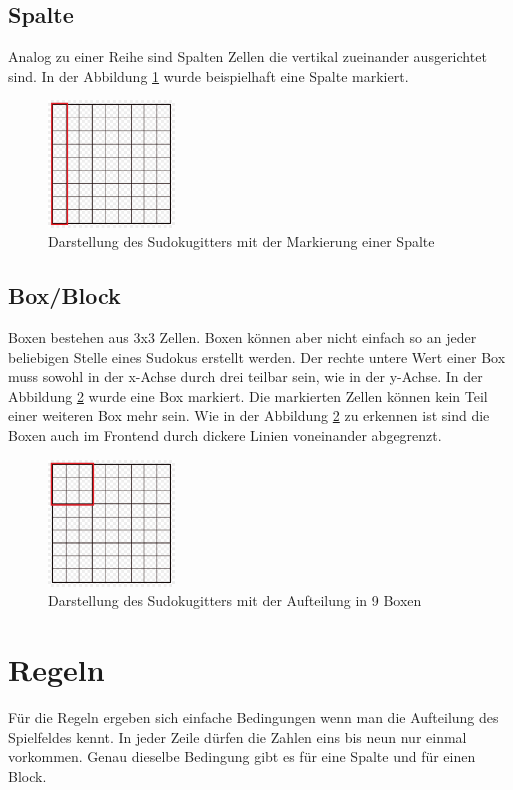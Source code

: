 \subsection{Spalte}
Analog zu einer Reihe sind Spalten Zellen die vertikal zueinander ausgerichtet sind. In der Abbildung \ref{fig:SudokugitterSpalte} wurde beispielhaft eine Spalte markiert.
\begin{figure}[htbp]
	\centering
	\includegraphics[width=0.3\textwidth]{images/sudokugitterSpalte.jpg}
	\caption{Darstellung des Sudokugitters mit der Markierung einer Spalte}
	\label{fig:SudokugitterSpalte}
\end{figure}

\subsection{Box/Block}
Boxen bestehen aus 3x3 Zellen. Boxen können aber nicht einfach so an jeder beliebigen Stelle eines Sudokus erstellt werden. Der rechte untere Wert einer Box muss sowohl in der x-Achse durch drei teilbar sein, wie in der y-Achse. In der Abbildung \ref{fig:SudokugitterBox} wurde eine Box markiert. Die markierten Zellen können kein Teil einer weiteren Box mehr sein. Wie in der Abbildung \ref{fig:SudokugitterBox} zu erkennen ist sind die Boxen auch im Frontend durch dickere Linien voneinander abgegrenzt. 
\begin{figure}[htbp]
	\centering
	\includegraphics[width=0.3\textwidth]{images/sudokugitterBox.jpg}
	\caption{Darstellung des Sudokugitters mit der Aufteilung in 9 Boxen}
	\label{fig:SudokugitterBox}
\end{figure}

\section{Regeln}
Für die Regeln ergeben sich einfache Bedingungen wenn man die Aufteilung des Spielfeldes kennt. In jeder Zeile dürfen die Zahlen eins bis neun nur einmal vorkommen. Genau dieselbe Bedingung gibt es für eine Spalte und für einen Block.

